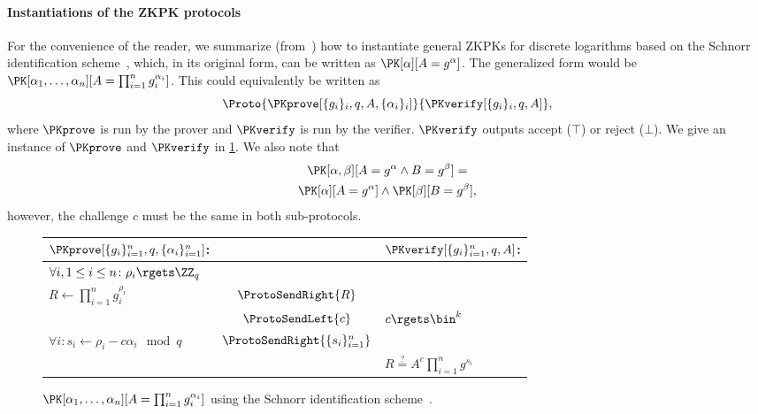 \paragraph*{Instantiations of the \acs{ZKPK} protocols}

For the convenience of the reader, we summarize 
(from~\cite{Camenisch-phdthesis}) how to instantiate general \acp{ZKPK} for 
discrete logarithms based on the Schnorr identification scheme~\cite{Schnorr}, 
which, in its original form, can be written as \(\PK[\alpha][A = g^\alpha]\).
The generalized form would be \(\PK[\alpha_1, \dotsc, \alpha_n][A = 
    \prod_{i=1}^n g_i^{\alpha_i}]\).
This could equivalently be written as
\begin{equation*}
  \Proto%
  {\PKprove[\{g_i\}_i, q, A, \{\alpha_i\}_i]}%
  {\PKverify[\{g_i\}_i, q, A]},
\end{equation*}
where \(\PKprove\) is run by the prover and \(\PKverify\) is run by the 
verifier.
\(\PKverify\) outputs accept (\(\top\)) or reject (\(\bot\)).
We give an instance of \(\PKprove\) and \(\PKverify\) in \cref{PKalgorithms}.
We also note that
\begin{multline*}
  \PK[\alpha, \beta][A = g^\alpha \land B = g^\beta] = \\
  \PK[\alpha][A = g^\alpha] \land \PK[\beta][B = g^\beta],
\end{multline*}
however, the challenge \(c\) must be the same in both sub-protocols.

\begin{figure*}
  \small
  \begin{tabular}{lcl}
    \(\PKprove[\{g_i\}_{i=1}^n, q, \{\alpha_i\}_{i=1}^n]\):
    &
    & \(\PKverify[\{g_i\}_{i=1}^n, q, A]\):
    \\
    \midrule

    \(\forall i, 1\leq i\leq n\colon \rho_i\rgets \ZZ_q\)
    &
    &
    \\

    \(R\gets \prod_{i=1}^n g_i^{\rho_i}\)
    & \(\ProtoSendRight{R}\)
    &
    \\

    & \(\ProtoSendLeft{c}\)
    & \(c\rgets \bin^k\)
    \\

    \(\forall i\colon s_i\gets \rho_i - c\alpha_i \mod q\)
    & \(\ProtoSendRight{\{s_i\}_{i=1}^n}\)
    &
    \\

    &
    & \(R \stackrel{?}{=} A^c \prod_{i=1}^n g^{s_i}\)
    \\
    
  \end{tabular}
  \caption{%
    \(\PK[\alpha_1, \dotsc, \alpha_n][A = \prod_{i=1}^n g_i^{\alpha_i}]\) using 
    the Schnorr identification scheme~\cite{Camenisch-phdthesis}.
  }%
  \label{PKalgorithms}
\end{figure*}

